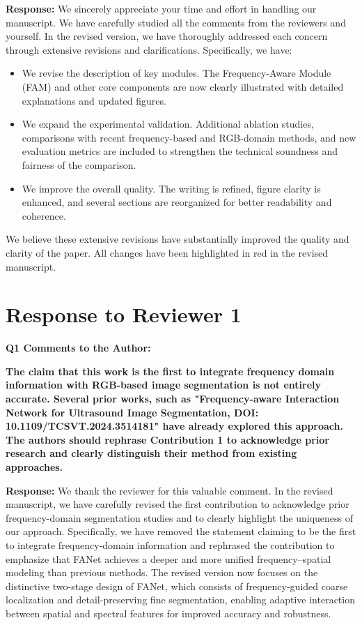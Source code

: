 \documentclass[lettersize,journal,onecolumn,12pt]{IEEEtran}
\begin{document}
\textbf{Response:} 
We sincerely appreciate your time and effort in handling our manuscript. We have carefully studied all the comments from the reviewers and yourself. In the revised version, we have thoroughly addressed each concern through extensive revisions and clarifications. Specifically, we have:
\begin{itemize}

    \item We revise the description of key modules. The Frequency-Aware Module (FAM) and other core components are now clearly illustrated with detailed explanations and updated figures.

    \item We expand the experimental validation. Additional ablation studies, comparisons with recent frequency-based and RGB-domain methods, and new evaluation metrics are included to strengthen the technical soundness and fairness of the comparison.
    
    \item We improve the overall quality. The writing is refined, figure clarity is enhanced, and several sections are reorganized for better readability and coherence.

\end{itemize}

We believe these extensive revisions have substantially improved the quality and clarity of the paper. All changes have been highlighted in red in the revised manuscript. \\[10pt]


\clearpage

\section{Response to Reviewer 1}

{\color{BlueGreen} \textbf{Q1 Comments to the Author:}

\textbf{The claim that this work is the first to integrate frequency domain information with RGB-based image segmentation is not entirely accurate. Several prior works, such as "Frequency-aware Interaction Network for Ultrasound Image Segmentation, DOI: 10.1109/TCSVT.2024.3514181" have already explored this approach. The authors should rephrase Contribution 1 to acknowledge prior research and clearly distinguish their method from existing approaches.}} 

\textbf{Response:}
We thank the reviewer for this valuable comment. 
In the revised manuscript, we have carefully revised the first contribution to acknowledge prior frequency-domain segmentation studies and to clearly highlight the uniqueness of our approach. 
Specifically, we have removed the statement claiming to be the first to integrate frequency-domain information and rephrased the contribution to emphasize that FANet achieves a deeper and more unified frequency–spatial modeling than previous methods. 
The revised version now focuses on the distinctive two-stage design of FANet, which consists of frequency-guided coarse localization and detail-preserving fine segmentation, enabling adaptive interaction between spatial and spectral features for improved accuracy and robustness.
\end{document}
